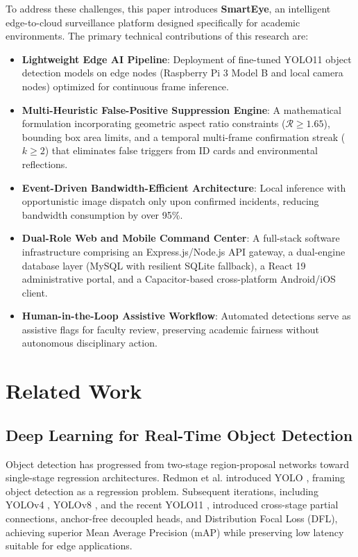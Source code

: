 \documentclass[conference]{IEEEtran}
\begin{document}
To address these challenges, this paper introduces \textbf{SmartEye}, an intelligent edge-to-cloud surveillance platform designed specifically for academic environments. The primary technical contributions of this research are:
\begin{itemize}
    \item \textbf{Lightweight Edge AI Pipeline}: Deployment of fine-tuned YOLO11 object detection models on edge nodes (Raspberry Pi 3 Model B and local camera nodes) optimized for continuous frame inference.
    \item \textbf{Multi-Heuristic False-Positive Suppression Engine}: A mathematical formulation incorporating geometric aspect ratio constraints ($\mathcal{R} \ge 1.65$), bounding box area limits, and a temporal multi-frame confirmation streak ($k \ge 2$) that eliminates false triggers from ID cards and environmental reflections.
    \item \textbf{Event-Driven Bandwidth-Efficient Architecture}: Local inference with opportunistic image dispatch only upon confirmed incidents, reducing bandwidth consumption by over 95\%.
    \item \textbf{Dual-Role Web and Mobile Command Center}: A full-stack software infrastructure comprising an Express.js/Node.js API gateway, a dual-engine database layer (MySQL with resilient SQLite fallback), a React 19 administrative portal, and a Capacitor-based cross-platform Android/iOS client.
    \item \textbf{Human-in-the-Loop Assistive Workflow}: Automated detections serve as assistive flags for faculty review, preserving academic fairness without autonomous disciplinary action.
\end{itemize}

\section{Related Work}

\subsection{Deep Learning for Real-Time Object Detection}
Object detection has progressed from two-stage region-proposal networks \cite{ren2017faster} toward single-stage regression architectures. Redmon et al. introduced YOLO \cite{redmon2016you}, framing object detection as a regression problem. Subsequent iterations, including YOLOv4 \cite{bochkovskiy2020yolov4}, YOLOv8 \cite{jocher2023ultralytics}, and the recent YOLO11 \cite{ultralytics2024yolo11}, introduced cross-stage partial connections, anchor-free decoupled heads, and Distribution Focal Loss (DFL), achieving superior Mean Average Precision (mAP) while preserving low latency suitable for edge applications.
\end{document}
